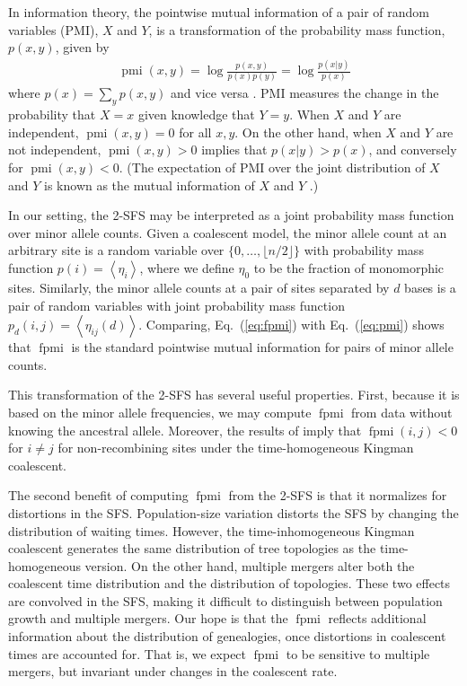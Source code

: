 \documentclass[11pt, letterpaper]{article}   	%
\newcommand{\eq}[1]{Eq.~(\ref{#1})}
\newcommand{\floor}[1]{\lfloor #1 \rfloor}
\newcommand{\E}[1]{\left< #1 \right>}
\DeclareMathOperator{\pmi}{pmi}
\DeclareMathOperator{\fpmi}{fpmi}
\begin{document}
In information theory, the pointwise mutual information of a pair of random variables (PMI), $X$ and $Y$, is a transformation of the probability mass function, $p(x,y)$, given by
\begin{align}
    \pmi(x,y) = \log \frac{p(x,y)}{p(x)p(y)} = \log \frac{p(x|y)}{p(x)}
    \label{eq:pmi}
\end{align}
where $p(x) = \sum_y p(x,y)$ and vice versa \autocite{ChurchHanks1990}.
PMI measures the change in the probability that $X=x$ given knowledge that $Y=y$.
When $X$ and $Y$ are independent, $\pmi(x,y) = 0$ for all $x,y$.
On the other hand, when $X$ and $Y$ are not independent, $\pmi(x,y) > 0$ implies that $p(x|y) > p(x)$, and conversely for $\pmi(x,y) < 0$.
(The expectation of PMI over the joint distribution of $X$ and $Y$ is known as the mutual information of $X$ and $Y$ \autocite{CoverThomas1991}.)

In our setting, the 2-SFS may be interpreted as a joint probability mass function over minor allele counts.
Given a coalescent model, the minor allele count at an arbitrary site is a random variable over $\{0,\ldots,\floor{n/2}\}$ with probability mass function $p(i) = \E{\eta_i}$, where we define $\eta_0$ to be the fraction of monomorphic sites.
Similarly, the minor allele counts at a pair of sites separated by $d$ bases is a pair of random variables with joint probability mass function $p_d(i,j) = \E{\eta_{ij}(d)}$.
Comparing, \eq{eq:fpmi} with \eq{eq:pmi} shows that $\fpmi$ is the standard pointwise mutual information for pairs of minor allele counts.

This transformation of the 2-SFS has several useful properties.
First, because it is based on the minor allele frequencies, we may compute $\fpmi$ from data without knowing the ancestral allele.
Moreover, the results of \cite{Fu1995} imply that $\fpmi(i,j) < 0$ for $i\neq j$ for non-recombining sites under the time-homogeneous Kingman coalescent.

The second benefit of computing $\fpmi$ from the 2-SFS is that it normalizes for distortions in the SFS.
Population-size variation distorts the SFS by changing the distribution of waiting times.
However, the time-inhomogeneous Kingman coalescent generates the same distribution of tree topologies as the time-homogeneous version.
On the other hand, multiple mergers alter both the coalescent time distribution and the distribution of topologies.
These two effects are convolved in the SFS, making it difficult to distinguish between population growth and multiple mergers.
Our hope is that the $\fpmi$ reflects additional information about the distribution of genealogies, once distortions in coalescent times are accounted for.
That is, we expect $\fpmi$ to be sensitive to multiple mergers, but invariant under changes in the coalescent rate.
\end{document}
